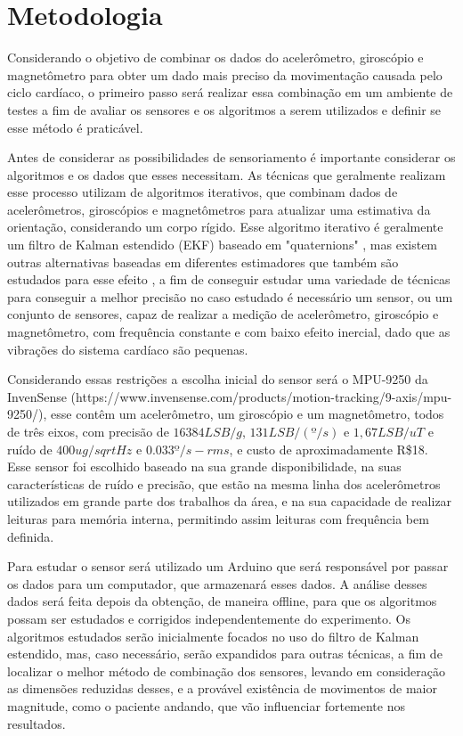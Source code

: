 \chapter{Metodologia}

    Considerando o objetivo de combinar os dados do acelerômetro, giroscópio e magnetômetro para obter um dado mais preciso da movimentação causada pelo ciclo cardíaco, o primeiro passo será realizar essa combinação em um ambiente de testes a fim de avaliar os sensores e os algoritmos a serem utilizados e definir se esse método é praticável.

    Antes de considerar as possibilidades de sensoriamento é importante considerar os algoritmos e os dados que esses necessitam. As técnicas que geralmente realizam esse processo utilizam de algoritmos iterativos, que combinam dados de acelerômetros, giroscópios e magnetômetros para atualizar uma estimativa da orientação, considerando um corpo rígido. Esse algoritmo iterativo é geralmente um filtro de Kalman estendido (EKF) baseado em "quaternions" %
 , mas existem outras alternativas baseadas em diferentes estimadores que também são estudados para esse efeito %
, a fim de conseguir estudar uma variedade de técnicas para conseguir a melhor precisão no caso estudado é necessário um sensor, ou um conjunto de sensores, capaz de realizar a medição de acelerômetro, giroscópio e magnetômetro, com frequência constante e com baixo efeito inercial, dado que as vibrações do sistema cardíaco são pequenas.%
    
    Considerando essas restrições a escolha inicial do sensor será o MPU-9250 da InvenSense (https://www.invensense.com/products/motion-tracking/9-axis/mpu-9250/), esse contêm um acelerômetro, um giroscópio e um magnetômetro, todos de três eixos, com precisão de $16384 LSB/g$, $131 LSB/(º/s)$ e $1,67 LSB/uT$ e ruído de $400 ug/sqrt{Hz}$ e $0.033 º/s-rms$\cite{MPU9250}, e custo de aproximadamente R\$18. Esse sensor foi escolhido baseado na sua grande disponibilidade, na suas características de ruído e precisão, que estão na mesma linha dos acelerômetros utilizados em grande parte dos trabalhos da área, e na sua capacidade de realizar leituras para memória interna, permitindo assim leituras com frequência bem definida. %

    Para estudar o sensor será utilizado um Arduino que será responsável por passar os dados para um computador, que armazenará esses dados. A análise desses dados será feita depois da obtenção, de maneira offline, para que os algoritmos possam ser estudados e corrigidos independentemente do experimento. Os algoritmos estudados serão inicialmente focados no uso do filtro de Kalman estendido, mas, caso necessário, serão expandidos para outras técnicas, a fim de localizar o melhor método de combinação dos sensores, levando em consideração as dimensões reduzidas desses, e a provável existência de movimentos de maior magnitude, como o paciente andando, que vão influenciar fortemente nos resultados.


